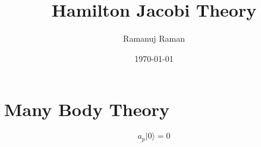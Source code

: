 \documentclass{article}
\title{Hamilton Jacobi Theory}
\author{Ramanuj Raman}
\date{\today}
\begin{document}
\maketitle
\section{Many Body Theory}
\[a_{p}|0\rangle=0\]
\end{document}
